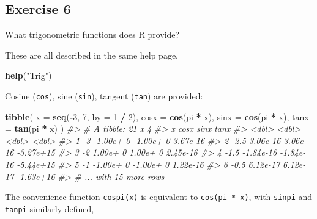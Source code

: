 \documentclass[]{book}
\newenvironment{Shaded}{\begin{snugshade}}{\end{snugshade}}
\newcommand{\CommentTok}[1]{\textcolor[rgb]{0.56,0.35,0.01}{\textit{#1}}}
\newcommand{\DataTypeTok}[1]{\textcolor[rgb]{0.13,0.29,0.53}{#1}}
\newcommand{\DecValTok}[1]{\textcolor[rgb]{0.00,0.00,0.81}{#1}}
\newcommand{\KeywordTok}[1]{\textcolor[rgb]{0.13,0.29,0.53}{\textbf{#1}}}
\newcommand{\NormalTok}[1]{#1}
\newcommand{\OperatorTok}[1]{\textcolor[rgb]{0.81,0.36,0.00}{\textbf{#1}}}
\newcommand{\StringTok}[1]{\textcolor[rgb]{0.31,0.60,0.02}{#1}}
\theoremstyle{plain}
\theoremstyle{remark}
\theoremstyle{definition}
\theoremstyle{definition}
\theoremstyle{definition}
\theoremstyle{remark}
\begin{document}
\hypertarget{exercise-6-2}{%
\subsection{Exercise 6}\label{exercise-6-2}}

What trigonometric functions does R provide?

These are all described in the same help page,

\begin{Shaded}
\begin{Highlighting}[]
\KeywordTok{help}\NormalTok{(}\StringTok{"Trig"}\NormalTok{)}
\end{Highlighting}
\end{Shaded}

Cosine (\texttt{cos}), sine (\texttt{sin}), tangent (\texttt{tan}) are
provided:

\begin{Shaded}
\begin{Highlighting}[]
\KeywordTok{tibble}\NormalTok{(}
  \DataTypeTok{x =} \KeywordTok{seq}\NormalTok{(}\OperatorTok{-}\DecValTok{3}\NormalTok{, }\DecValTok{7}\NormalTok{, }\DataTypeTok{by =} \DecValTok{1} \OperatorTok{/}\StringTok{ }\DecValTok{2}\NormalTok{),}
  \DataTypeTok{cosx =} \KeywordTok{cos}\NormalTok{(pi }\OperatorTok{*}\StringTok{ }\NormalTok{x),}
  \DataTypeTok{sinx =} \KeywordTok{cos}\NormalTok{(pi }\OperatorTok{*}\StringTok{ }\NormalTok{x),}
  \DataTypeTok{tanx =} \KeywordTok{tan}\NormalTok{(pi }\OperatorTok{*}\StringTok{ }\NormalTok{x)}
\NormalTok{)}
\CommentTok{#> # A tibble: 21 x 4}
\CommentTok{#>       x      cosx      sinx      tanx}
\CommentTok{#>   <dbl>     <dbl>     <dbl>     <dbl>}
\CommentTok{#> 1  -3   -1.00e+ 0 -1.00e+ 0  3.67e-16}
\CommentTok{#> 2  -2.5  3.06e-16  3.06e-16 -3.27e+15}
\CommentTok{#> 3  -2    1.00e+ 0  1.00e+ 0  2.45e-16}
\CommentTok{#> 4  -1.5 -1.84e-16 -1.84e-16 -5.44e+15}
\CommentTok{#> 5  -1   -1.00e+ 0 -1.00e+ 0  1.22e-16}
\CommentTok{#> 6  -0.5  6.12e-17  6.12e-17 -1.63e+16}
\CommentTok{#> # ... with 15 more rows}
\end{Highlighting}
\end{Shaded}

The convenience function \texttt{cospi(x)} is equivalent to
\texttt{cos(pi\ *\ x)}, with \texttt{sinpi} and \texttt{tanpi} similarly
defined,
\end{document}
